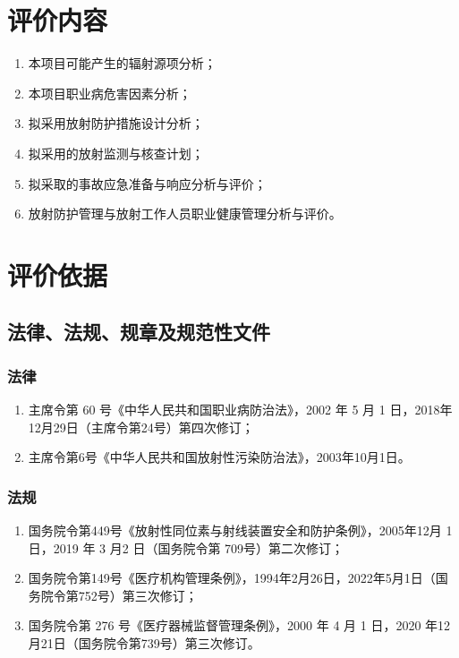 \section{评价内容}

\begin{enumerate}
\item 本项目可能产生的辐射源项分析；
\item 本项目职业病危害因素分析；
\item 拟采用放射防护措施设计分析；
\item 拟采用的放射监测与核查计划；
\item 拟采取的事故应急准备与响应分析与评价；
\item 放射防护管理与放射工作人员职业健康管理分析与评价。
\end{enumerate}

\section{评价依据}

\subsection{法律、法规、规章及规范性文件}

\subsubsection{法律}

\begin{enumerate}
\item 主席令第 60 号《中华人民共和国职业病防治法》，2002 年 5 月 1 日，2018年12月29日（主席令第24号）第四次修订；
\item 主席令第6号《中华人民共和国放射性污染防治法》，2003年10月1日。
\end{enumerate}

\subsubsection{法规}

\begin{enumerate}
\item 国务院令第449号《放射性同位素与射线装置安全和防护条例》，2005年12月 1 日，2019 年 3 月2 日（国务院令第 709号）第二次修订；
\item 国务院令第149号《医疗机构管理条例》，1994年2月26日，2022年5月1日（国务院令第752号）第三次修订；
\item 国务院令第 276 号《医疗器械监督管理条例》，2000 年 4 月 1 日，2020 年12月21日（国务院令第739号）第三次修订。
\end{enumerate}

